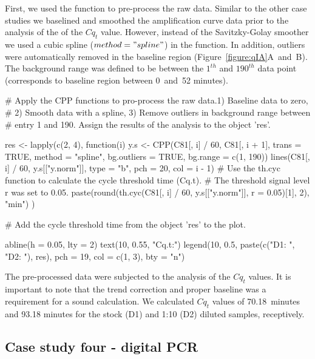 First, we used the  function to pre-process the raw data. Similar to 
the other case studies we baselined and smoothed the amplification curve data 
prior to the analysis of the of the $Cq_{t}$ value. However, instead of the 
Savitzky-Golay smoother we used a cubic spline ($method = "spline"$) in the 
 function. In addition, outliers were automatically removed in the 
baseline region (Figure~\ref{figure:qIA}A~and~B). The background range was 
defined to be between the $1^{th}$ and $190^{th}$ data point (corresponds to 
baseline region between 0~and~52 minutes).

\begin{example}
# Apply the CPP functions to pro-process the raw data.1) Baseline data to zero, 
# 2) Smooth data with a spline, 3) Remove outliers in background range between 
# entry 1 and 190. Assign the results of the analysis to the object 'res'.

res <- lapply(c(2, 4), function(i) {
  y.s <- CPP(C81[, i] / 60, C81[, i + 1],
             trans = TRUE, 
             method = "spline",
             bg.outliers = TRUE,
             bg.range = c(1, 190))
  lines(C81[, i] / 60, y.s[["y.norm"]], type = "b", pch = 20, col = i - 1)
  # Use the th.cyc function to calculate the cycle threshold time (Cq.t). 
  # The threshold signal level r was set to 0.05.
  paste(round(th.cyc(C81[, i] / 60, y.s[["y.norm"]], r = 0.05)[1], 2), "min")
})

# Add the cycle threshold time from the object 'res' to the plot.

abline(h = 0.05, lty = 2)
text(10, 0.55, "Cq.t:")
legend(10, 0.5, paste(c("D1: ", "D2: "), res), pch = 19, col = c(1, 3), 
       bty = "n")
\end{example}

The pre-processed data were subjected to the analysis of the $Cq_{t}$ values. 
It is important to note that the trend correction and proper baseline was a 
requirement for a sound calculation. We calculated $Cq_{t}$ values of 
70.18~minutes and 93.18 minutes for the stock (D1) and 1:10 (D2) diluted 
samples, receptively.

\subsection{Case study four - digital PCR}

